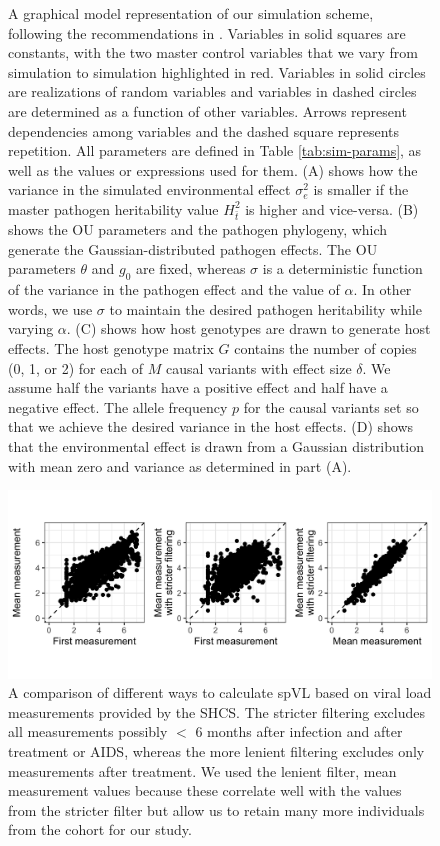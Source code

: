 \documentclass[11pt]{article}
\begin{document}
\begin{doublespace}
\begin{figure}[H]
\begin{tikzpicture}
	\end{tikzpicture}
	\caption{A graphical model representation of our simulation scheme, following the recommendations in \cite{Hohna2014}. Variables in solid squares are constants, with the two master control variables that we vary from simulation to simulation highlighted in red. Variables in solid circles are realizations of random variables and variables in dashed circles are determined as a function of other variables. Arrows represent dependencies among variables and the dashed square represents repetition. All parameters are defined in Table \ref{tab:sim-params}, as well as the values or expressions used for them. (A) shows how the variance in the simulated environmental effect $\sigma^2_{e}$ is smaller if the master pathogen heritability value $H^2_{\bar{t}}$ is higher and vice-versa. (B) shows the OU parameters and the pathogen phylogeny, which generate the Gaussian-distributed pathogen effects. The OU parameters $\theta$ and $g_0$ are fixed, whereas $\sigma$ is a deterministic function of the variance in the pathogen effect and the value of $\alpha$. In other words, we use $\sigma$ to maintain the desired pathogen heritability while varying $\alpha$. (C) shows how host genotypes are drawn to generate host effects. The host genotype matrix $G$ contains the number of copies (0, 1, or 2) for each of $M$ causal variants with effect size $\delta$. We assume half the variants have a positive effect and half have a negative effect. The allele frequency $p$ for the causal variants set so that we achieve the desired variance in the host effects. (D) shows that the environmental effect is drawn from a Gaussian distribution with mean zero and variance as determined in part (A).}
	\label{fig:sim-design}
\end{figure}

\begin{figure}[H]
\begin{center}
\includegraphics[width = 0.7\linewidth]{figures/spvl_calculation_comparison.png}
	\caption{A comparison of different ways to calculate spVL based on viral load measurements provided by the SHCS. The stricter filtering excludes all measurements possibly $<$ 6 months after infection and after treatment or AIDS, whereas the more lenient filtering excludes only measurements after treatment. We used the lenient filter, mean measurement values because these correlate well with the values from the stricter filter but allow us to retain many more individuals from the cohort for our study.}
	\label{fig:spvl-calc-comparison}
	\end{center}
\end{figure}


\end{doublespace}
\end{document}
